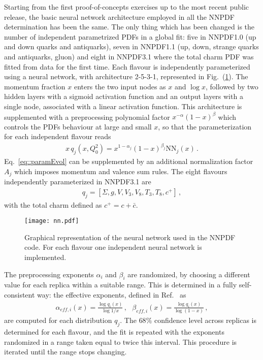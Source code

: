 %
Starting from the first proof-of-concepts exercises up to the most recent public release, the basic
neural network architecture employed in all the NNPDF determination has been the same.
The only thing which has been changed is the number of independent parametrized PDFs in a global fit:
five in NNPDF1.0 (up and down quarks and antiquarks), 
seven in NNPDF1.1 (up, down, strange quarks and antiquarks, gluon) and eight in NNPDF3.1
where the total charm PDF was fitted from data for the first time.
Each flavour is independently parameterized using a neural network,
with architecture 2-5-3-1, represented in Fig.~(\ref{nn}). 
The momentum fraction $x$ enters the two input nodes as $x$ and $\log{x}$, followed by two hidden layers with a sigmoid activation function and an output layers with a single node, 
associated with a linear activation function. 
This architecture is supplemented with a preprocessing polynomial factor $x^{-\alpha}\left(1-x\right)^{\beta}$ which controls the PDFs behaviour
at large and small $x$, so that the parameterization for each independent flavour reads
\begin{align}
	\label{eq::paramEvol}
	x\,q_j\left(x, Q_0^2\right) = x^{1-\alpha_{j}}\left(1-x\right)^{\beta_{j}}\text{NN}_{j}\left(x\right)\,.
\end{align}
Eq.~\eqref{eq::paramEvol} can be supplemented by an additional normalization factor $A_j$ which imposes momentum
and valence sum rules. The eight flavours independently parameterized in NNPDF3.1 are 
\begin{align}
    \label{eq:nnpdf31IC_basis}
    q_j = \left[\Sigma, g, V, V_3, V_8, T_3, T_8, c^+ \right]\,,
\end{align} 
with the total charm defined as $c^+ = c +\bar{c}$.
\begin{figure}[htb]     
	\begin{center}
		\texttt{[image: nn.pdf]}
	\end{center}
    \caption{Graphical representation of the neural network used in the NNPDF code.
    For each flavour one independent neural network is implemented.}
	\label{nn}                 
\end{figure}
The preprocessing exponents $\alpha_i$ and $\beta_i$ are randomized, by choosing a different value for each replica
within a suitable range. This is determined in a fully self-consistent way: the effective exponents, defined in
Ref.~\cite{Ball:2014uwa} as 
\begin{align}
    \label{eq:effective_exp}
    \alpha_{eff,i}\left(x\right) = \frac{\log q_i\left(x\right)}{\log 1/x}\,, \,\,\,\,
    \beta_{eff,i}\left(x\right) = \frac{\log q_i\left(x\right)}{\log\left(1-x\right)}\,,
\end{align}
are computed for each distribution $q_j$. The $68\%$ confidence level across replicas
is determined for each flavour, and the fit is repeated with the exponents randomized in a range taken equal to twice this 
interval. This procedure is iterated until the range stops changing.

